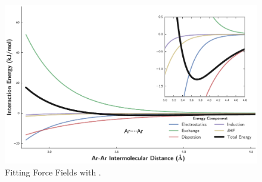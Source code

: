 \begin{enumerate}

\end{enumerate}


\begin{figure}
\centering
\includegraphics[width=\textwidth]{pointer/sapt.pdf}
\caption[\sapt-based force field fitting]
    {Fitting Force Fields with \sapt.
        }
\label{fig:pointer-sapt}
\end{figure}
